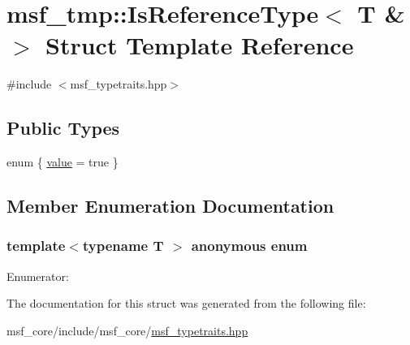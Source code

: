 \hypertarget{structmsf__tmp_1_1IsReferenceType_3_01T_01_6_01_4}{\section{msf\-\_\-tmp\-:\-:Is\-Reference\-Type$<$ T \& $>$ Struct Template Reference}
\label{structmsf__tmp_1_1IsReferenceType_3_01T_01_6_01_4}
}


{\ttfamily \#include $<$msf\-\_\-typetraits.\-hpp$>$}

\subsection*{Public Types}
\begin{DoxyCompactItemize}
\item 
enum \{ \hyperlink{structmsf__tmp_1_1IsReferenceType_3_01T_01_6_01_4_a7e260bd8029d90b31ca9edefed2f6f12a63197a77c99fad7bd8d8f1d7b70f08c1}{value} =  true
 \}
\end{DoxyCompactItemize}


\subsection{Member Enumeration Documentation}
\hypertarget{structmsf__tmp_1_1IsReferenceType_3_01T_01_6_01_4_a7e260bd8029d90b31ca9edefed2f6f12}{\subsubsection[{anonymous enum}]{\setlength{\rightskip}{0pt plus 5cm}template$<$typename T $>$ anonymous enum}}\label{structmsf__tmp_1_1IsReferenceType_3_01T_01_6_01_4_a7e260bd8029d90b31ca9edefed2f6f12}
\begin{Desc}
\item[Enumerator\-: ]\par
\begin{description}
\item[{\em 
\hypertarget{structmsf__tmp_1_1IsReferenceType_3_01T_01_6_01_4_a7e260bd8029d90b31ca9edefed2f6f12a63197a77c99fad7bd8d8f1d7b70f08c1}{value}\label{structmsf__tmp_1_1IsReferenceType_3_01T_01_6_01_4_a7e260bd8029d90b31ca9edefed2f6f12a63197a77c99fad7bd8d8f1d7b70f08c1}
}]\end{description}
\end{Desc}



The documentation for this struct was generated from the following file\-:\begin{DoxyCompactItemize}
\item 
msf\-\_\-core/include/msf\-\_\-core/\hyperlink{msf__typetraits_8hpp}{msf\-\_\-typetraits.\-hpp}\end{DoxyCompactItemize}
